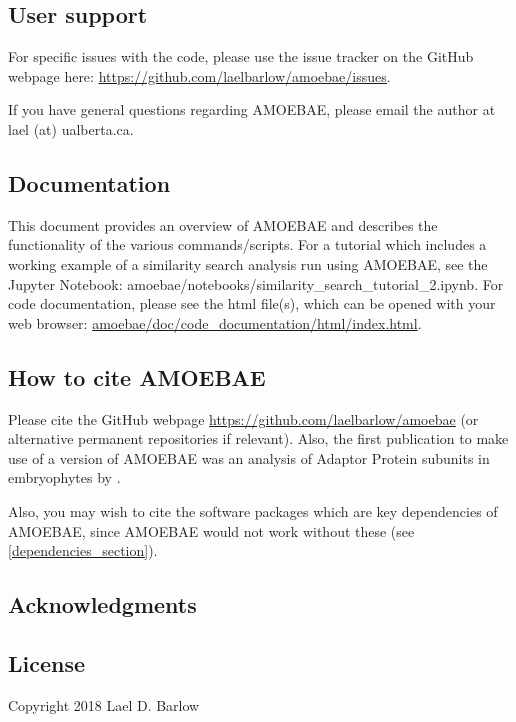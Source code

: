 \documentclass[12pt,letterpaper]{article}
\begin{document}
\begin{linenumbers}
\subsection{User support}

For specific issues with the code, please use the issue tracker on the GitHub
    webpage here: \url{https://github.com/laelbarlow/amoebae/issues}. 

If you have general questions regarding AMOEBAE, please email the author at
    lael (at) ualberta.ca.

\subsection{Documentation}

This document provides an overview of AMOEBAE and describes the functionality
of the various commands/scripts. For a tutorial which includes a working
example of a similarity search analysis run using AMOEBAE, see the Jupyter
Notebook: amoebae/notebooks/similarity\_search\_tutorial\_2.ipynb. For code
documentation, please see the html file(s), which can be opened with your web
browser: \url{amoebae/doc/code_documentation/html/index.html}.


\subsection{How to cite AMOEBAE}

Please cite the GitHub webpage \url{https://github.com/laelbarlow/amoebae} (or
alternative permanent repositories if relevant). Also, the first publication to
make use of a version of AMOEBAE was an analysis of Adaptor Protein subunits in
embryophytes by \cite{larson2019}.

Also, you may wish to cite the software packages which are key dependencies of
AMOEBAE, since AMOEBAE would not work without these (see
\autoref*{dependencies_section}).

\subsection{Acknowledgments}

\subsection{License}
\label{license_section}

Copyright 2018 Lael D. Barlow


\end{linenumbers}
\end{document}
